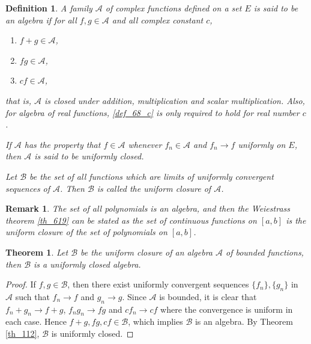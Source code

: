 \documentclass[11pt]{book}
\newtheorem{definition}{Definition}[chapter]
\newtheorem{theorem}{Theorem}[chapter]
\newtheorem{remark}{Remark}[chapter]
\theoremstyle{definition}
\numberwithin{equation}{chapter}
\begin{document}
\medskip

\begin{definition}\label{def_68}
A family $\mathscr{A}$ of complex functions defined on a set $E$ is said to be an algebra if for all $f, g \in \mathscr{A}$ and all complex constant $c$,
\begin{enumerate}[label=(\alph*)]
    \item $f + g \in \mathscr{A}$, \label{def_68_a}
    
    \item $fg \in \mathscr{A}$, \label{def_68_b}
    
    \item $cf \in \mathscr{A}$, \label{def_68_c}
\end{enumerate}
that is, $\mathscr{A}$ is closed under addition, multiplication and scalar multiplication. Also, for algebra of real functions, \ref{def_68_c} is only required to hold for real number $c$.

If $\mathscr{A}$ has the property that $f \in \mathscr{A}$ whenever $f_n \in \mathscr{A}$ and $f_n \to f$ uniformly on $E$, then $\mathscr{A}$ is said to be uniformly closed.

Let $\mathscr{B}$ be the set of all functions which are limits of uniformly convergent sequences of $\mathscr{A}$. Then $\mathscr{B}$ is called the uniform closure of $\mathscr{A}$.
\end{definition}

\medskip

\begin{remark}
The set of all polynomials is an algebra, and then the Weiestrass theorem \ref{th_619} can be stated as the set of continuous functions on $[a,b]$ is the uniform closure of the set of polynomials on $[a,b]$.
\end{remark}

\medskip

\begin{theorem}
Let $\mathscr{B}$ be the uniform closure of an algebra $\mathscr{A}$ of bounded functions, then $\mathscr{B}$ is a uniformly closed algebra.
\end{theorem}
\begin{proof}
If $f,g \in \mathscr{B}$, then there exist uniformly convergent sequences $\{f_n\}, \{g_n\}$ in $\mathscr{A}$ such that $f_n \to f$ and $g_n \to g$. Since $\mathscr{A}$ is bounded, it is clear that $f_n + g_n \to f + g$, $f_ng_n \to fg$ and $cf_n \to cf$ where the convergence is uniform in each case. Hence $f + g, fg, cf \in \mathscr{B}$, which implies $\mathscr{B}$ is an algebra. By Theorem \ref{th_112}, $\mathscr{B}$ is uniformly closed.
\end{proof}
\end{document}
